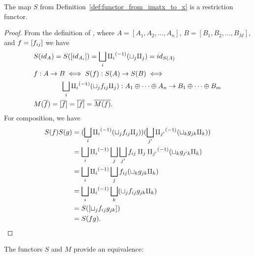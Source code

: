 \begin{lemma}\label{lem:s_is_a_functor}
  The map $S$ from Definition~\ref{def:functor_from_imatx_to_x} is a restriction functor.
\end{lemma}
\begin{proof}
  From the definition of \imatx, where $A = [A_1,A_2,\ldots,A_n]$, $B=[B_1,B_2,\ldots,B_M]$,
  and $f = [f_{ij}]$ we have
  \begin{align*}
    &S(id_A)  = S([id_{A_i}]) = \bigsqcup_i {\amalg_{i}}^{(-1)} (\sqcup_j \amalg_{j}) = id_{S(A)}\\
    &f: A\to B  \iff S(f):S(A)\to S(B) \iff \\
    &\qquad \qquad  \bigsqcup_i {\amalg_{i}}^{(-1)} (\sqcup_j f_{ij} \amalg_{j}) : A_1\oplus\cdots\oplus A_n \to B_1\oplus\cdots\oplus B_m\\
    &M(\overline{f}) = [\overline{f}] = \overline{[f]} = \overline{M(f)}.
  \end{align*}
  For composition, we have
  \begin{align*}
    S(f)S(g) & = (\bigsqcup_i {\amalg_{i}}^{(-1)} (\sqcup_j f_{ij} \amalg_{j}))
                  (\bigsqcup_{j'} {\amalg_{j'}}^{(-1)} (\sqcup_k g_{jk} \amalg_{k})) \\
    &= \bigsqcup_i {\amalg_{i}}^{(-1)} \bigsqcup_j \bigsqcup_{j'} f_{ij} \amalg_{j} {\amalg_{j'}}^{(-1)}
            (\sqcup_k g_{j'k} \amalg_{k}) \\
    &= \bigsqcup_i {\amalg_{i}}^{(-1)} \bigsqcup_j  f_{ij} (\sqcup_k g_{jk} \amalg_{k}) \\
    &= \bigsqcup_i {\amalg_{i}}^{(-1)} \bigsqcup_k (\sqcup_j  f_{ij}  g_{jk} \amalg_{k}) \\
    &= S([\sqcup_j f_{ij} g_{jk}]) \\
    &= S(f g).
  \end{align*}

\end{proof}

The functors $S$ and $M$ provide an equivalence:

